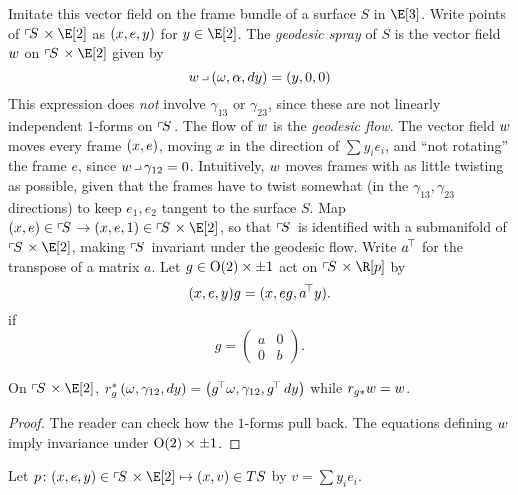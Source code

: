 Imitate this vector field on the frame bundle of a surface \(S\) in \(\E[3]\).
Write points of \(\frameBundle{S} \times \E[2]\) as \(\left(x,e,y\right)\) for \(y \in \E[2]\).
The \emph{geodesic spray} of \(S\) is  the vector field \(w\) on \(\frameBundle{S} \times \E[2]\) given by
\[
\geodesicVectorField \hook \pr{\omega,\alpha,dy}=\pr{y,0,0}
\]
This expression does \emph{not} involve \(\gamma_{13}\) or \(\gamma_{23}\), since these are not linearly independent \(1\)-forms on \(\left\ulcorner\!S\right.\).
The flow of \(w\) is the \emph{geodesic flow}.%
The vector field \(w\) moves every frame \(\left(x,e\right)\), moving \(x\) in the direction of \(\sum y_i e_i\), and ``not rotating'' the frame \(e\), since \(\geodesicVectorField \hook \gamma_{12}=0\).
Intuitively, \(w\) moves frames with as little twisting as possible, given that the frames have to twist somewhat (in the \(\gamma_{13}, \gamma_{23}\) directions) to keep \(e_1,e_2\) tangent to the surface \(S\).
Map \(\pr{x,e} \in \frameBundle{S} \to \pr{x,e,1} \in \frameBundle{S} \times \E[2]\), so that \(\left\ulcorner\!S\right.\) is identified with a submanifold of \(\frameBundle{S} \times \E[2]\), making \(\left\ulcorner\!S\right.\) invariant under the geodesic flow.
Write \(a^{\!\top}\) for the transpose of a matrix \(a\).
Let \(g \in \textrm{O}\!\left(2\right) \times \pm 1\) act on \(\frameBundle{S} \times \R[p]\) by
\[
(x,e,y)g=(x,eg,a^{\!\top} y).
\]
if
\[
g = \begin{pmatrix}
        a & 0 \\
        0 & b
       \end{pmatrix}.
\]

\begin{lemma}
On \(\frameBundle{S} \times \E[2]\), \(r^*_g \left(\omega,\gamma_{12},dy\right)=\left(g^{\!\top} \omega, \gamma_{12}, g^{\!\top} \, dy\right)\) while \(r_{g*} w=w\).
\end{lemma}
\begin{proof}
The reader can check how the \(1\)-forms pull back.
The equations defining \(w\) imply invariance under \(\textrm{O}\!\left(2\right) \times \pm 1\).
\end{proof}

Let \(p \colon (x,e,y) \in \frameBundle{S} \times \E[2] \mapsto (x,v) \in TS\) by \(v=\sum y_i e_i\).

